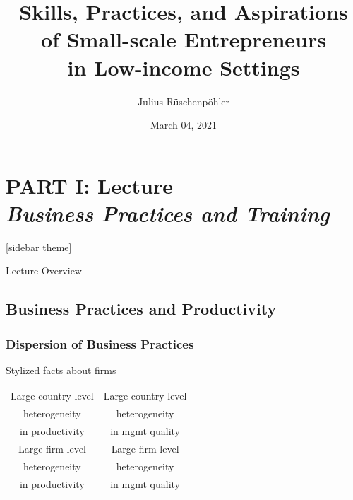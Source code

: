 \documentclass[hideothersubsections, usenames,dvipsnames,11pt]{beamer}
\title[]{Skills, Practices, and Aspirations \\ of Small-scale Entrepreneurs \\ in Low-income Settings}
\author[]{Julius R{\"u}schenp{\"o}hler\inst{}}
\institute[]{\inst{} UC Berkeley, CEGA}
\date{March 04, 2021}
\begin{document}
\section{\textbf{PART I: Lecture} \\ \quad \emph{Business Practices and Training}}



\begin{frame}
\titlepage
\end{frame}


[sidebar theme]

\begin{frame}{Lecture Overview}
\end{frame}


\subsection{Business Practices and Productivity}


\begin{frame}
\frametitle{Dispersion of Business Practices}

Stylized facts about firms
\begin{table}[ht]
\small
\begin{center}
\begin{tabular}{| c | c | c | c | c | c |}
\hline
Large \textcolor{cerulean}{country-level} 	& Large \textcolor{cerulean}{country-level} 	\\
heterogeneity 			& heterogeneity 		\\
in \textcolor{bdf}{productivity} 		& in \textcolor{bdf}{mgmt quality}	 	\\
\hline
Large \textcolor{cerulean}{firm-level} 		& Large \textcolor{cerulean}{firm-level} 		\\
heterogeneity			& heterogeneity 		\\
in \textcolor{bdf}{productivity}      	& in \textcolor{bdf}{mgmt quality} \\
\hline
\end{tabular}
\end{center}
\end{table}

\end{frame}
\end{document}
